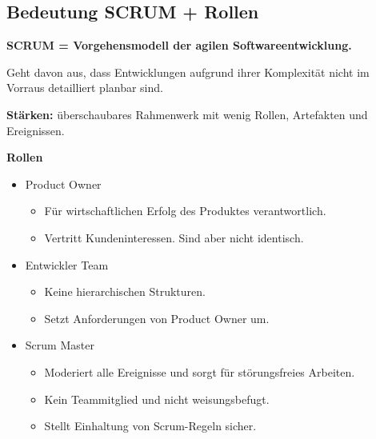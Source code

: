 \subsection{Bedeutung SCRUM + Rollen  }
\textbf{SCRUM = Vorgehensmodell der agilen Softwareentwicklung.}

Geht davon aus, dass Entwicklungen aufgrund ihrer Komplexität nicht im Vorraus detailliert planbar sind.

\textbf{Stärken:} überschaubares Rahmenwerk mit wenig Rollen, Artefakten und Ereignissen.

\textbf{Rollen}
\begin{itemize}
    \item Product Owner
    \begin{itemize}
        \item Für wirtschaftlichen Erfolg des Produktes verantwortlich.
        \item Vertritt Kundeninteressen. Sind aber nicht identisch.
    \end{itemize}
    
    \item Entwickler Team
    \begin{itemize}
        \item Keine hierarchischen Strukturen.
        \item Setzt Anforderungen von Product Owner um.
    \end{itemize}
    
    \item Scrum Master
    \begin{itemize}
        \item Moderiert alle Ereignisse und sorgt für störungsfreies Arbeiten.
        \item Kein Teammitglied und nicht weisungsbefugt.
        \item Stellt Einhaltung von Scrum-Regeln sicher.
    \end{itemize}
    
\end{itemize}
